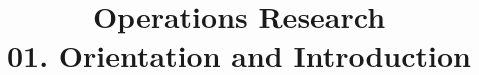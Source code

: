 \documentclass[11pt]{extarticle}
\begin{document}
\title{\texorpdfstring{\vspace{15mm} Operations Research\\ 01. Orientation and Introduction}{Operations Research\\ 01. Orientation and Introduction}}
\author{}
\date{}
\maketitle
\newpage

%
%
%
%
%
%
\end{document}
